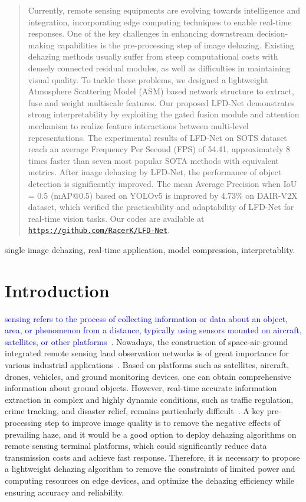 \documentclass[lettersize,journal]{IEEEtran}
\begin{document}
\begin{abstract}
Currently, remote sensing equipments are evolving towards intelligence and integration, incorporating edge computing techniques to enable real-time responses. One of the key challenges in enhancing downstream decision-making capabilities is the pre-processing step of image dehazing. Existing dehazing methods usually suffer from steep computational costs with densely connected residual modules, as well as difficulties in maintaining visual quality. To tackle these problems, we designed a lightweight Atmosphere Scattering Model (ASM) based network structure to extract, fuse and weight multiscale features. Our proposed LFD-Net demonstrates strong interpretability by exploiting the gated fusion module and attention mechanism to realize feature interactions between multi-level representations. The experimental results of LFD-Net on SOTS dataset reach an average Frequency Per Second (FPS) of 54.41, approximately 8 times faster than seven most popular SOTA methods with equivalent metrics. After image dehazing by LFD-Net, the performance of object detection is significantly improved. The mean Average Precision when IoU = 0.5 (mAP@0.5) based on YOLOv5 is improved by 4.73\% on DAIR-V2X dataset, which verified the practicability and adaptability of LFD-Net for real-time vision tasks. Our codes are available at {\color[HTML]{DD00DD} \texttt{\url{https://github.com/RacerK/LFD-Net}}}.
\end{abstract}

\begin{IEEEkeywords}
single image dehazing, real-time application, model compression, interpretablity.
\end{IEEEkeywords}

\section{Introduction}
 \textcolor{blue}{sensing refers to the process of collecting information or data about an object, area, or phenomenon from a distance, typically using sensors mounted on aircraft, satellites, or other platforms~\cite{lillesand2014remote}.} Nowadays, the construction of space-air-ground integrated remote sensing land observation networks is of great importance for various industrial applications~\cite{li2020nasa, tam2021adaptive}. Based on platforms such as satellites, aircraft, drones, vehicles, and ground monitoring devices, one can obtain comprehensive information about ground objects. However, real-time accurate information extraction in complex and highly dynamic conditions, such as traffic regulation, crime tracking, and disaster relief, remains particularly difficult~\cite{zheng2022dehaze, han2021edge, makarau2014haze}. A key pre-processing step to improve image quality is to remove the negative effects of prevailing haze, and it would be a good option to deploy dehazing algorithms on remote sensing terminal platforms, which could significantly reduce data transmission costs and achieve fast response. Therefore, it is necessary to propose a lightweight dehazing algorithm to remove the constraints of limited power and computing resources on edge devices, and optimize the dehazing efficiency while ensuring accuracy and reliability.
\end{document}

